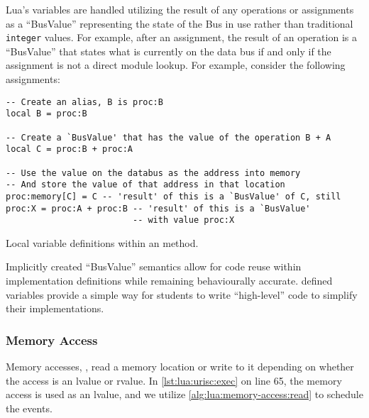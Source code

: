 \noindent Lua's  variables are handled utilizing the result of any operations or assignments as a ``BusValue'' representing the state of the Bus in use rather than traditional \texttt{integer} values. For example, after an assignment, the result of an operation is a ``BusValue'' that states what is currently on the data bus if and only if the assignment is not a direct module lookup. For example, consider the following  assignments: 

\begin{listing}[h!]
\begin{verbatim}
-- Create an alias, B is proc:B
local B = proc:B

-- Create a `BusValue' that has the value of the operation B + A
local C = proc:B + proc:A

-- Use the value on the databus as the address into memory
-- And store the value of that address in that location
proc:memory[C] = C -- 'result' of this is a `BusValue' of C, still
proc:X = proc:A + proc:B -- 'result' of this is a `BusValue' 
                         -- with value proc:X
\end{verbatim}
\caption{Local variable definitions within an  method.}
\end{listing}

\noindent Implicitly created ``BusValue'' semantics allow for code reuse within implementation definitions while remaining behaviourally accurate.  defined variables provide a simple way for students to write ``high-level'' code to simplify their implementations.

\subsubsection*{Memory Access}

Memory accesses, , read a memory location or write to it depending on whether the access is an lvalue or rvalue. In \cref{lst:lua:urisc:exec} on line 65, the memory access is used as an lvalue, and we utilize \cref{alg:lua:memory-access:read} to schedule the events.

